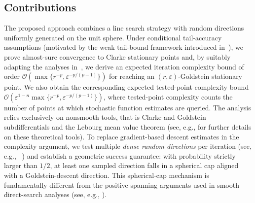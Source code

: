 \documentclass[11pt,a4paper]{article}
\newcommand{\Dexp}{p}
\newcommand{\sara}[1]{{\color{red}{\textbf{[SS: #1]}}\color{black}}}
\begin{document}
\subsection{Contributions} \label{subsec:contributions}
The proposed approach combines a line search strategy with random directions uniformly generated on the unit sphere. 
Under conditional tail-accuracy assumptions (motivated by the weak tail-bound framework introduced in~\cite{MR4758401}), we prove almost-sure convergence to Clarke stationary points and, by suitably
adapting the analyses in~\cite{MR4151319,MR4060460}, we derive an expected
iteration complexity bound of order
\(\mathcal O(\max\{r^{-p},\varepsilon^{-p/(p-1)}\})\) for reaching an
\((r,\varepsilon)\)-Goldstein stationary point. We also obtain the corresponding
expected tested-point complexity bound
\(\mathcal O(\varepsilon^{1-n}\max\{r^{-p},\varepsilon^{-p/(p-1)}\})\), where
tested-point complexity counts the number of points at which stochastic function
estimates are queried.
The analysis relies exclusively on nonsmooth tools, that is Clarke and Goldstein subdifferentials and the Lebourg mean value theorem (see, e.g., \cite{Clarke1990,Goldstein1977,Jahn1996} for further details on these theoretical tools). To replace gradient-based descent estimates in the complexity argument, we test multiple \emph{dense random directions} per iteration (see, e.g., \ \cite{MR3627456}) and establish a geometric success guarantee: with probability strictly larger than $1/2$, at least one sampled direction falls in a spherical cap aligned with a Goldstein-descent direction. This spherical-cap mechanism is fundamentally different from the positive-spanning arguments used in smooth direct-search analyses (see, e.g., \cite{MR4359469}). %
\end{document}
